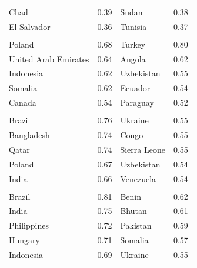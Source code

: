 \documentclass[
  11pt,
]{article}
\begin{document}
\begin{table}
\begin{tabular}[t]{>{\raggedright\arraybackslash}p{12em}r>{\raggedright\arraybackslash}p{10em}r}
\hspace{1em}Chad & 0.39 & Sudan & 0.38\\
\hspace{1em}El Salvador & 0.36 & Tunisia & 0.37\\
\addlinespace[0.3em]
\multicolumn{4}{l}{\textbf{Governing}}\\
\hspace{1em}Poland & 0.68 & Turkey & 0.80\\
\hspace{1em}United Arab Emirates & 0.64 & Angola & 0.62\\
\hspace{1em}Indonesia & 0.62 & Uzbekistan & 0.55\\
\hspace{1em}Somalia & 0.62 & Ecuador & 0.54\\
\hspace{1em}Canada & 0.54 & Paraguay & 0.52\\
\addlinespace[0.3em]
\multicolumn{4}{l}{\textbf{Individual}}\\
\hspace{1em}Brazil & 0.76 & Ukraine & 0.55\\
\hspace{1em}Bangladesh & 0.74 & Congo & 0.55\\
\hspace{1em}Qatar & 0.74 & Sierra Leone & 0.55\\
\hspace{1em}Poland & 0.67 & Uzbekistan & 0.54\\
\hspace{1em}India & 0.66 & Venezuela & 0.54\\
\addlinespace[0.3em]
\multicolumn{4}{l}{\textbf{Informational}}\\
\hspace{1em}Brazil & 0.81 & Benin & 0.62\\
\hspace{1em}India & 0.75 & Bhutan & 0.61\\
\hspace{1em}Philippines & 0.72 & Pakistan & 0.59\\
\hspace{1em}Hungary & 0.71 & Somalia & 0.57\\
\hspace{1em}Indonesia & 0.69 & Ukraine & 0.55\\
\bottomrule
\end{tabular}
\end{table}
\end{document}
